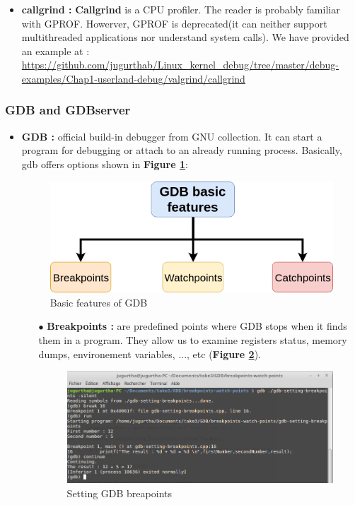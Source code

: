 \begin{itemize}
	\item \textbf{callgrind : } \textbf{Callgrind} is a CPU profiler. The reader is probably familiar with GPROF. Howerver, GPROF is deprecated(it can neither support multithreaded applications nor understand system calls).
We have provided an example at : {\color{blue}\url{https://github.com/jugurthab/Linux_kernel_debug/tree/master/debug-examples/Chap1-userland-debug/valgrind/callgrind}}


\end{itemize}

\subsubsection{GDB and GDBserver}


\begin{itemize}
	\item \textbf{GDB : } official build-in debugger from GNU collection. It can  start a program for debugging or attach to an already running process. Basically, gdb offers options shown in \textbf{Figure \ref{Basic features of GDB}}:
\begin{figure}[H]
		\centering
        \includegraphics[scale=0.40]{img/solution/basic-usage-gdb.png}
        \caption{Basic features of GDB}
        \label{Basic features of GDB}
    \end{figure}	
	
\begin{itemize}
\item[$\bullet$] \textbf{Breakpoints : } are predefined points where GDB stops when it finds them in a program. They allow us to examine registers status,
memory dumps, environement variables, ..., etc (\textbf{Figure \ref{Setting GDB breapoints}}).
\begin{figure}[H]
		\centering
        \includegraphics[scale=0.30]{img/solution/gdb-break-continue.png}
        \caption{Setting GDB breapoints}
        \label{Setting GDB breapoints}
    \end{figure}	




\end{itemize}
\end{itemize}
